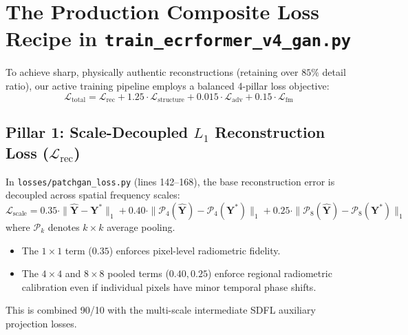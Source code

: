 \section{The Production Composite Loss Recipe in \texttt{train\_ecrformer\_v4\_gan.py}}
To achieve sharp, physically authentic reconstructions (retaining over $85\%$ detail ratio), our active training pipeline employs a balanced 4-pillar loss objective:
\begin{equation}
\mathcal{L}_{\text{total}} = \mathcal{L}_{\text{rec}} + 1.25 \cdot \mathcal{L}_{\text{structure}} + 0.015 \cdot \mathcal{L}_{\text{adv}} + 0.15 \cdot \mathcal{L}_{\text{fm}}
\end{equation}

\subsection{Pillar 1: Scale-Decoupled $L_1$ Reconstruction Loss ($\mathcal{L}_{\text{rec}}$)}
In \texttt{losses/patchgan\_loss.py} (lines 142--168), the base reconstruction error is decoupled across spatial frequency scales:
\begin{equation}
\mathcal{L}_{\text{scale}} = 0.35 \cdot \|\hat{\mathbf{Y}} - \mathbf{Y}^*\|_1 + 0.40 \cdot \|\mathcal{P}_4(\hat{\mathbf{Y}}) - \mathcal{P}_4(\mathbf{Y}^*)\|_1 + 0.25 \cdot \|\mathcal{P}_8(\hat{\mathbf{Y}}) - \mathcal{P}_8(\mathbf{Y}^*)\|_1
\end{equation}
where $\mathcal{P}_k$ denotes $k \times k$ average pooling. 
\begin{itemize}
    \item The $1 \times 1$ term ($0.35$) enforces pixel-level radiometric fidelity.
    \item The $4 \times 4$ and $8 \times 8$ pooled terms ($0.40, 0.25$) enforce regional radiometric calibration even if individual pixels have minor temporal phase shifts.
\end{itemize}
This is combined 90/10 with the multi-scale intermediate SDFL auxiliary projection losses.

